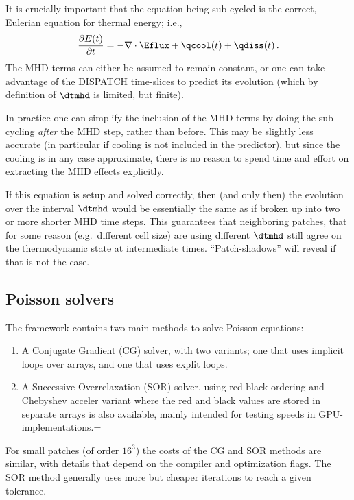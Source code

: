 \documentclass[paper=a4,fontsize=11pt]{scrartcl}
\numberwithin{equation}{section}		%
\numberwithin{figure}{section}			%
\numberwithin{table}{section}				%
\begin{document}
It is crucially important that the equation being sub-cycled is the correct, Eulerian equation for thermal energy; i.e.,
\begin{equation}
    \frac{\partial E(t)}{\partial t} = - \nabla\cdot {\Eflux} + \qcool(t)  + \qdiss(t)\,.
\end{equation}
The MHD terms can either be assumed to remain constant, or one can take advantage of the DISPATCH time-slices to predict its evolution (which by definition of $\dtmhd$ is limited, but finite).

In practice one can simplify the inclusion of the MHD terms by doing the sub-cycling \textit{after} the MHD step, rather than before.   This may be slightly less accurate (in particular if cooling is not included in the predictor), but since the cooling is in any case approximate, there is no reason to spend time and effort on extracting the MHD effects explicitly.

If this equation is setup and solved correctly, then (and only then) the evolution over the interval $\dtmhd$ would be essentially the same as if broken up into two or more shorter MHD time steps.   This guarantees that neighboring patches, that for some reason (e.g.\ different cell size) are using different $\dtmhd$ still agree on the thermodynamic state at intermediate times.   ``Patch-shadows'' will reveal if that is not the case.

\subsection{Poisson solvers}

The framework contains two main methods to solve Poisson equations:
\begin{enumerate}
    \item A Conjugate Gradient (CG) solver, with two variants; one that uses implicit loops over arrays, and one that uses explit loops.
    \item A Successive Overrelaxation (SOR) solver, using red-black ordering and Chebyshev acceler variant where the red and black values are stored in separate arrays is also available, mainly intended for testing speeds in GPU-implementations.=
\end{enumerate}
For small patches (of order $16^3$) the costs of the CG and SOR methods are similar, with details that depend on the compiler and optimization flags.  The SOR method generally uses more but cheaper iterations to reach a given tolerance.  
\end{document}
